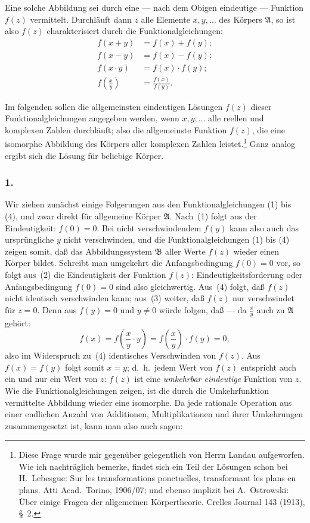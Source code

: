 \documentclass[12pt,a4paper]{article}
\begin{document}
Eine solche Abbildung sei durch eine --- nach dem Obigen eindeutige --- Funktion $f(z)$ vermittelt. Durchl\"auft dann $z$ alle Elemente $x, y, \ldots$ des K\"orpers $\mathfrak{A}$, so ist also $f(z)$ charakterisiert durch die Funktionalgleichungen:
\begin{align}
f(x+y) &= f(x) + f(y); \\
f(x-y) &= f(x) - f(y); \\
f(x \cdot y) &= f(x) \cdot f(y); \\
f\left(\frac{x}{y}\right) &= \frac{f(x)}{f(y)}.
\end{align}

Im folgenden sollen die allgemeinsten eindeutigen L\"osungen $f(z)$ dieser Funktionalgleichungen angegeben werden, wenn $x, y, \ldots$ alle reellen und komplexen Zahlen durchl\"auft; also die allgemeinste Funktion $f(z)$, die eine isomorphe Abbildung des K\"orpers aller komplexen Zahlen leistet.\footnote{Diese Frage wurde mir gegen\"uber gelegentlich von Herrn Landau aufgeworfen. Wie ich nachtr\"aglich bemerke, findet sich ein Teil der L\"osungen schon bei H.\ Lebesgue: Sur les transformations ponctuelles, transformant les plans en plans. Atti Acad.\ Torino, 1906/07; und ebenso implizit bei A.\ Ostrowski: \"Uber einige Fragen der allgemeinen K\"orpertheorie. Crelles Journal 143 (1913), \S\ 2.} Ganz analog ergibt sich die L\"osung f\"ur beliebige K\"orper.

\subsubsection*{1.}

Wir ziehen zun\"achst einige Folgerungen aus den Funktionalgleichungen (1) bis (4), und zwar direkt f\"ur allgemeine K\"orper $\mathfrak{A}$. Nach~(1) folgt aus der Eindeutigkeit: $f(0) = 0$. Bei nicht verschwindendem $f(y)$ kann also auch das urspr\"ungliche $y$ nicht verschwinden, und die Funktionalgleichungen (1) bis (4) zeigen somit, da\ss{} das Abbildungssystem $\mathfrak{B}$ aller Werte $f(z)$ wieder einen K\"orper bildet. Schreibt man umgekehrt die Anfangsbedingung $f(0) = 0$ vor, so folgt aus~(2) die Eindeutigkeit der Funktion $f(z)$: Eindeutigkeitsforderung oder Anfangsbedingung $f(0) = 0$ sind also gleichwertig. Aus~(4) folgt, da\ss{} $f(z)$ nicht identisch verschwinden kann; aus~(3) weiter, da\ss{} $f(z)$ nur verschwindet f\"ur $z = 0$. Denn aus $f(y) = 0$ und $y \neq 0$ w\"urde folgen, da\ss{} --- da $\frac{x}{y}$ auch zu $\mathfrak{A}$ geh\"ort:
\[f(x) = f\left(\frac{x}{y} \cdot y\right) = f\left(\frac{x}{y}\right) \cdot f(y) = 0,\]
also im Widerspruch zu~(4) identisches Verschwinden von $f(z)$. Aus $f(x) = f(y)$ folgt somit $x = y$; d.\ h.\ jedem Wert von $f(z)$ entspricht auch ein und nur ein Wert von $z$: $f(z)$ ist eine \emph{umkehrbar eindeutige} Funktion von $z$. Wie die Funktionalgleichungen zeigen, ist die durch die Umkehrfunktion vermittelte Abbildung wieder eine isomorphe. Da jede rationale Operation aus einer endlichen Anzahl von Additionen, Multiplikationen und ihrer Umkehrungen zusammengesetzt ist, kann man also auch sagen:
\end{document}
